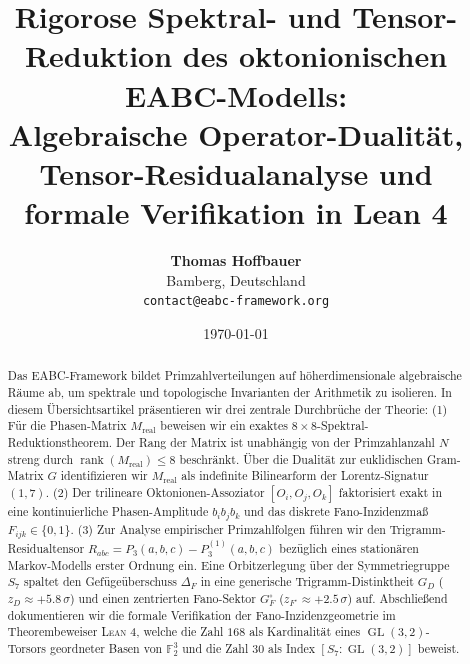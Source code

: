 \documentclass[11pt,a4paper]{article}
\theoremstyle{remark}
\begin{document}
	
	\title{\textbf{Rigorose Spektral- und Tensor-Reduktion des oktonionischen EABC-Modells:}\\
		\Large Algebraische Operator-Dualität, Tensor-Residualanalyse und formale Verifikation in Lean 4}
	
	\author{\textbf{Thomas Hoffbauer}\\
		\small Bamberg, Deutschland\\
		\small \texttt{contact@eabc-framework.org}}
	
	\date{\today}
	
	\maketitle
	
	\begin{abstract}
		Das EABC-Framework bildet Primzahlverteilungen auf höherdimensionale algebraische Räume ab, um spektrale und topologische Invarianten der Arithmetik zu isolieren. In diesem Übersichtsartikel präsentieren wir drei zentrale Durchbrüche der Theorie: 
		(1) Für die Phasen-Matrix $M_{\mathrm{real}}$ beweisen wir ein exaktes $8 \times 8$-Spektral-Reduktionstheorem. Der Rang der Matrix ist unabhängig von der Primzahlanzahl $N$ streng durch $\operatorname{rank}(M_{\mathrm{real}}) \le 8$ beschränkt. Über die Dualität zur euklidischen Gram-Matrix $G$ identifizieren wir $M_{\mathrm{real}}$ als indefinite Bilinearform der Lorentz-Signatur $(1,7)$.
		(2) Der trilineare Oktonionen-Assoziator $[O_i, O_j, O_k]$ faktorisiert exakt in eine kontinuierliche Phasen-Amplitude $b_i b_j b_k$ und das diskrete Fano-Inzidenzmaß $F_{ijk} \in \{0,1\}$. 
		(3) Zur Analyse empirischer Primzahlfolgen führen wir den Trigramm-Residualtensor $R_{abc} = P_3(a,b,c) - P_3^{(1)}(a,b,c)$ bezüglich eines stationären Markov-Modells erster Ordnung ein. Eine Orbitzerlegung über der Symmetriegruppe $S_7$ spaltet den Gefügeüberschuss $\Delta_F$ in eine generische Trigramm-Distinktheit $G_D$ ($z_D \approx +5.8\,\sigma$) und einen zentrierten Fano-Sektor $G_F^\circ$ ($z_{F^\circ} \approx +2.5\,\sigma$) auf. 
		Abschließend dokumentieren wir die formale Verifikation der Fano-Inzidenzgeometrie im Theorembeweiser \textsc{Lean 4}, welche die Zahl $168$ als Kardinalität eines $\operatorname{GL}(3,2)$-Torsors geordneter Basen von $\mathbb{F}_2^3$ und die Zahl $30$ als Index $[S_7 : \operatorname{GL}(3,2)]$ beweist.
	\end{abstract}
	
	\tableofcontents
	\newpage
	
\end{document}
